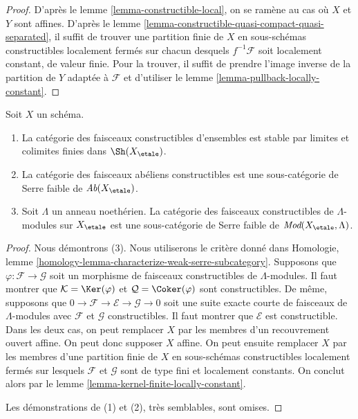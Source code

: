 \begin{proof}
D'après le lemme \ref{lemma-constructible-local}, on se ramène au cas
où $X$ et $Y$ sont affines. D'après le
lemme \ref{lemma-constructible-quasi-compact-quasi-separated},
il suffit de trouver une partition finie de $X$ en sous-schémas constructibles
localement fermés sur chacun desquels $f^{-1}\mathcal{F}$ soit localement
constant, de valeur finie.
Pour la trouver, il suffit de prendre l'image inverse de la partition de $Y$ adaptée à
$\mathcal{F}$ et d'utiliser le
lemme \ref{lemma-pullback-locally-constant}.
\end{proof}

\begin{lemma}
\label{lemma-constructible-abelian}
Soit $X$ un schéma.
\begin{enumerate}
\item La catégorie des faisceaux constructibles d'ensembles
est stable par limites et colimites finies dans $\Sh(X_\etale)$.
\item La catégorie des faisceaux abéliens constructibles est une
sous-catégorie de Serre faible de $\textit{Ab}(X_\etale)$.
\item Soit $\Lambda$ un anneau noethérien. La catégorie des
faisceaux constructibles de $\Lambda$-modules sur
$X_\etale$ est une sous-catégorie de Serre faible de
$\textit{Mod}(X_\etale, \Lambda)$.
\end{enumerate}
\end{lemma}

\begin{proof}
Nous démontrons (3). Nous utiliserons le critère donné dans
Homologie, lemme \ref{homology-lemma-characterize-weak-serre-subcategory}.
Supposons que $\varphi : \mathcal{F} \to \mathcal{G}$
soit un morphisme de faisceaux constructibles de $\Lambda$-modules.
Il faut montrer que $\mathcal{K} = \Ker(\varphi)$ et
$\mathcal{Q} = \Coker(\varphi)$ sont constructibles.
De même, supposons que
$0 \to \mathcal{F} \to \mathcal{E} \to \mathcal{G} \to 0$
soit une suite exacte courte de faisceaux de $\Lambda$-modules
avec $\mathcal{F}$ et $\mathcal{G}$ constructibles. Il faut montrer
que $\mathcal{E}$ est constructible.
Dans les deux cas, on peut remplacer $X$ par les membres d'un
recouvrement ouvert affine. On peut donc supposer $X$ affine.
On peut ensuite remplacer $X$ par les membres d'une
partition finie de $X$ en sous-schémas constructibles localement fermés
sur lesquels $\mathcal{F}$ et $\mathcal{G}$ sont de type fini et
localement constants. On conclut alors par le
lemme \ref{lemma-kernel-finite-locally-constant}.

\medskip\noindent
Les démonstrations de (1) et (2), très semblables, sont omises.
\end{proof}

